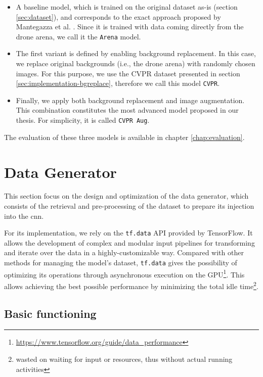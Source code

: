 \begin{itemize}
    \item A baseline model, which is trained on the original dataset as-is (section \ref{sec:dataset}), and corresponds to the exact approach proposed by Mantegazza et al. \cite{mantegazza2019visionbased}. Since it is trained with data coming directly from the drone arena, we call it the \texttt{Arena} model.
    \item The first variant is defined by enabling background replacement. In this case, we replace original backgrounds (i.e., the drone arena) with randomly chosen images. For this purpose, we use the CVPR dataset presented in section \ref{sec:implementation-bgreplace}, therefore we call this model \texttt{CVPR}.
    \item Finally, we apply both background replacement and image augmentation. This combination constitutes the most advanced model proposed in our thesis. For simplicity, it is called \texttt{CVPR Aug}.
\end{itemize}

The evaluation of these three models is available in chapter \ref{chap:evaluation}.




\section{Data Generator}
\label{sec:data-generator}

This section focus on the design and optimization of the data generator, which consists of the retrieval and pre-processing of the dataset to prepare its injection into the \gls{cnn}.

For its implementation, we rely on the \texttt{tf.data} API \cite{tfdata} provided by TensorFlow. It allows the development of complex and modular input pipelines for transforming and iterate over the data in a highly-customizable way. Compared with other methods for managing the model's dataset, \texttt{tf.data} gives the possibility of optimizing its operations through asynchronous execution on the GPU\footnote{\url{https://www.tensorflow.org/guide/data_performance}}. This allows achieving the best possible performance by minimizing the total idle time\footnote{wasted on waiting for input or resources, thus without actual running activities}.



\subsection{Basic functioning}
\label{subsec:data-generator-basic}

